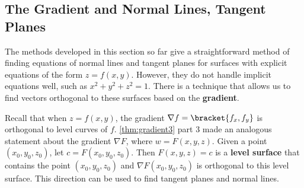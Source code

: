 \subsection*{The Gradient and Normal Lines, Tangent Planes}

The methods developed in this section so far give a straightforward method of finding equations of normal lines and tangent planes for surfaces with explicit equations of the form $z=f(x,y)$. However, they do not handle implicit equations well, such as $x^2+y^2+z^2=1$. There is a technique that allows us to find vectors orthogonal to these surfaces based on the \textbf{gradient}.


Recall that when $z=f(x,y)$, the gradient $\nabla f =\bracket{f_x,f_y}$ is orthogonal to level curves of $f$. \autoref{thm:gradient3} part 3 made an analogous statement about the gradient $\nabla F$, where $w= F(x,y,z)$. Given a point $(x_0,y_0,z_0)$, let $c = F(x_0,y_0,z_0)$. Then $F(x,y,z) = c$ is a \textbf{level surface} that contains the point $(x_0,y_0,z_0)$ and %
$\nabla F(x_0,y_0,z_0)$ is orthogonal to this level surface.
%
%
%
This direction can be used to find tangent planes and normal lines.

